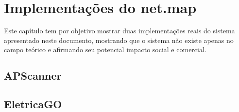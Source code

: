 \chapter{Implementações do net.map}\label{chp:implementations}

Este capítulo tem por objetivo mostrar duas implementações reais do sistema apresentado neste documento, mostrando que o sistema não existe apenas no campo teórico e afirmando seu potencial impacto social e comercial.

\section{APScanner}

\section{EletricaGO}